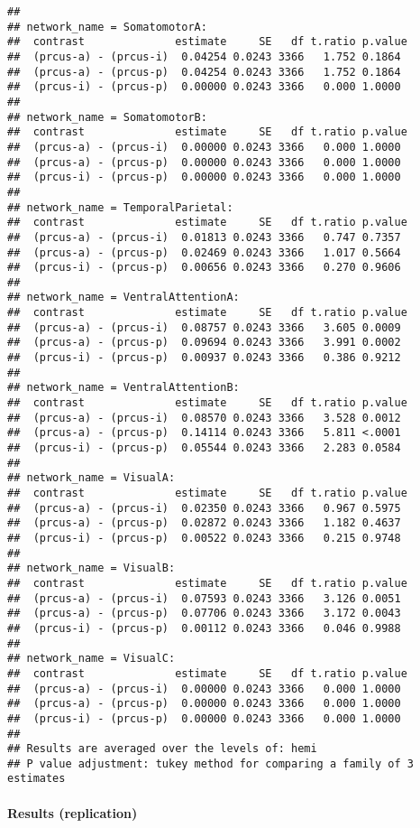 \documentclass[
]{article}
\begin{document}
\begin{verbatim}
## 
## network_name = SomatomotorA:
##  contrast              estimate     SE   df t.ratio p.value
##  (prcus-a) - (prcus-i)  0.04254 0.0243 3366   1.752 0.1864 
##  (prcus-a) - (prcus-p)  0.04254 0.0243 3366   1.752 0.1864 
##  (prcus-i) - (prcus-p)  0.00000 0.0243 3366   0.000 1.0000 
## 
## network_name = SomatomotorB:
##  contrast              estimate     SE   df t.ratio p.value
##  (prcus-a) - (prcus-i)  0.00000 0.0243 3366   0.000 1.0000 
##  (prcus-a) - (prcus-p)  0.00000 0.0243 3366   0.000 1.0000 
##  (prcus-i) - (prcus-p)  0.00000 0.0243 3366   0.000 1.0000 
## 
## network_name = TemporalParietal:
##  contrast              estimate     SE   df t.ratio p.value
##  (prcus-a) - (prcus-i)  0.01813 0.0243 3366   0.747 0.7357 
##  (prcus-a) - (prcus-p)  0.02469 0.0243 3366   1.017 0.5664 
##  (prcus-i) - (prcus-p)  0.00656 0.0243 3366   0.270 0.9606 
## 
## network_name = VentralAttentionA:
##  contrast              estimate     SE   df t.ratio p.value
##  (prcus-a) - (prcus-i)  0.08757 0.0243 3366   3.605 0.0009 
##  (prcus-a) - (prcus-p)  0.09694 0.0243 3366   3.991 0.0002 
##  (prcus-i) - (prcus-p)  0.00937 0.0243 3366   0.386 0.9212 
## 
## network_name = VentralAttentionB:
##  contrast              estimate     SE   df t.ratio p.value
##  (prcus-a) - (prcus-i)  0.08570 0.0243 3366   3.528 0.0012 
##  (prcus-a) - (prcus-p)  0.14114 0.0243 3366   5.811 <.0001 
##  (prcus-i) - (prcus-p)  0.05544 0.0243 3366   2.283 0.0584 
## 
## network_name = VisualA:
##  contrast              estimate     SE   df t.ratio p.value
##  (prcus-a) - (prcus-i)  0.02350 0.0243 3366   0.967 0.5975 
##  (prcus-a) - (prcus-p)  0.02872 0.0243 3366   1.182 0.4637 
##  (prcus-i) - (prcus-p)  0.00522 0.0243 3366   0.215 0.9748 
## 
## network_name = VisualB:
##  contrast              estimate     SE   df t.ratio p.value
##  (prcus-a) - (prcus-i)  0.07593 0.0243 3366   3.126 0.0051 
##  (prcus-a) - (prcus-p)  0.07706 0.0243 3366   3.172 0.0043 
##  (prcus-i) - (prcus-p)  0.00112 0.0243 3366   0.046 0.9988 
## 
## network_name = VisualC:
##  contrast              estimate     SE   df t.ratio p.value
##  (prcus-a) - (prcus-i)  0.00000 0.0243 3366   0.000 1.0000 
##  (prcus-a) - (prcus-p)  0.00000 0.0243 3366   0.000 1.0000 
##  (prcus-i) - (prcus-p)  0.00000 0.0243 3366   0.000 1.0000 
## 
## Results are averaged over the levels of: hemi 
## P value adjustment: tukey method for comparing a family of 3 estimates
\end{verbatim}

\hypertarget{results-replication-1}{%
\paragraph{Results (replication)}\label{results-replication-1}}
\end{document}
